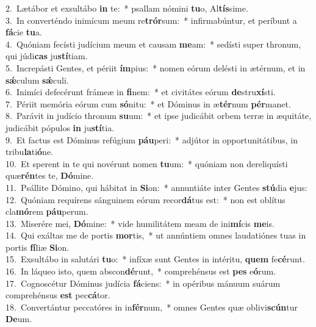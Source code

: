 {2.~}Lætábor et exsultábo \textbf{in} te:~* psallam nómini \textbf{tu}o, Al\textbf{tís}sime.\\
{3.~}In converténdo inimícum meum re\textbf{trór}sum:~* infirmabúntur, et períbunt a \textbf{fá}cie \textbf{tu}a.\\
{4.~}Quóniam fecísti judícium meum et causam \textbf{me}am:~* sedísti super thronum, qui júdi\textbf{cas} ju\textbf{stí}tiam.\\
{5.~}Increpásti Gentes, et périit \textbf{ím}pius:~* nomen eórum delésti in ætérnum, et in \textbf{sǽ}culum \textbf{sǽ}culi.\\
{6.~}Inimíci defecérunt frámeæ in \textbf{fi}nem:~* et civitátes eórum \textbf{de}stru\textbf{xí}sti.\\
{7.~}Périit memória eórum cum \textbf{só}nitu:~* et Dóminus in æ\textbf{tér}num \textbf{pér}manet.\\
{8.~}Parávit in judício thronum \textbf{su}um:~* et ipse judicábit orbem terræ in æquitáte, judicábit pópulos \textbf{in} ju\textbf{stí}tia.\\
{9.~}Et factus est Dóminus refúgium \textbf{páu}peri:~* adjútor in opportunitátibus, in tribu\textbf{la}ti\textbf{ó}ne.\\
{10.~}Et sperent in te qui novérunt nomen \textbf{tu}um:~* quóniam non dereliquísti quæ\textbf{rén}tes te, \textbf{Dó}mine.\\
{11.~}Psállite Dómino, qui hábitat in \textbf{Si}on:~* annuntiáte inter Gentes \textbf{stú}dia \textbf{e}jus:\\
{12.~}Quóniam requírens sánguinem eórum recor\textbf{dá}tus est:~* non est oblítus cla\textbf{mó}rem \textbf{páu}perum.\\
{13.~}Miserére mei, \textbf{Dó}mine:~* vide humilitátem meam de ini\textbf{mí}cis \textbf{me}is.\\
{14.~}Qui exáltas me de portis \textbf{mor}tis,~* ut annúntiem omnes laudatiónes tuas in portis \textbf{fí}liæ \textbf{Si}on.\\
{15.~}Exsultábo in salutári \textbf{tu}o:~* infíxæ sunt Gentes in intéritu, \textbf{quem} fe\textbf{cé}runt.\\
{16.~}In láqueo isto, quem abscon\textbf{dé}runt,~* comprehénsus est \textbf{pes} e\textbf{ó}rum.\\
{17.~}Cognoscétur Dóminus judícia \textbf{fá}ciens:~* in opéribus mánuum suárum comprehénsus \textbf{est} pec\textbf{cá}tor.\\
{18.~}Convertántur peccatóres in in\textbf{fér}num,~* omnes Gentes quæ oblivi\textbf{scún}tur \textbf{De}um.\\

